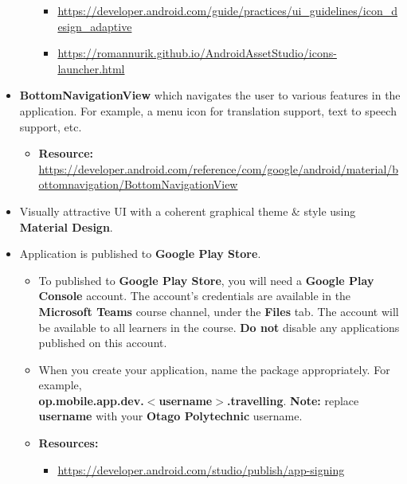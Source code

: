 \documentclass{article}
\begin{document}
\begin{itemize}
\begin{itemize}
		            \begin{itemize}
			            \item \footnotesize\href{https://developer.android.com/guide/practices/ui\_guidelines/icon\_design\_adaptive}{https://developer.android.com/guide/practices/ui\_guidelines/icon\_design\_adaptive}
			            \item \footnotesize\href{https://romannurik.github.io/AndroidAssetStudio/icons-launcher.html}{https://romannurik.github.io/AndroidAssetStudio/icons-launcher.html}
		            \end{itemize}
	      \end{itemize}
	\item \textbf{BottomNavigationView} which navigates the user to various features in the application. For example, a menu icon for translation support, text to speech support, etc.
	      \begin{itemize}
		      \item \textbf{Resource:} \footnotesize\href{https://developer.android.com/reference/com/google/android/material/bottomnavigation/BottomNavigationView}{https://developer.android.com/reference/com/google/android/material/bottomnavigation/BottomNavigationView}
	      \end{itemize}
	\item Visually attractive UI with a coherent graphical theme \& style using \textbf{Material Design}.
	\item Application is published to \textbf{Google Play Store}.
	      \begin{itemize}
		      \item To published to \textbf{Google Play Store}, you will need a \textbf{Google Play Console} account. The account's credentials are available in the \textbf{Microsoft Teams} course channel, under the \textbf{Files} tab. The account will be available to all learners in the course. \textbf{Do not} disable any applications published on this account.
		      \item When you create your application, name the package appropriately. For example, \\ \textbf{op.mobile.app.dev.$<$username$>$.travelling}. \textbf{Note:} replace \textbf{username} with your \textbf{Otago Polytechnic} username.
		      \item \textbf{Resources:}
		            \begin{itemize}
									\item \footnotesize\href{https://developer.android.com/studio/publish/app-signing}{https://developer.android.com/studio/publish/app-signing}

\end{itemize}
\end{itemize}
\end{itemize}
\end{document}
